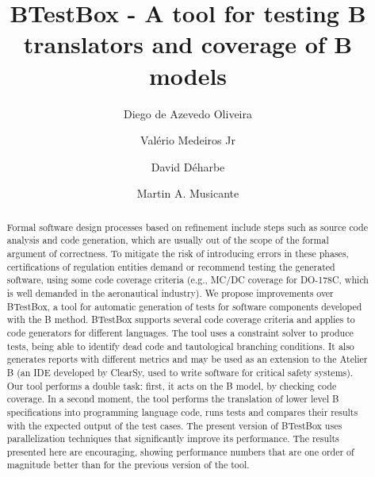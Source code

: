 \documentclass[runningheads]{llncs}
\begin{document}
%
\title{BTestBox - A tool for testing B translators and coverage of B models}
%
%
\author{Diego de Azevedo Oliveira  \and
Val{\'e}rio Medeiros Jr \and
David D{\'e}harbe \and
Martin A. Musicante 
}
%
%
%
\maketitle              %
%
\begin{abstract}
Formal software design processes based on refinement include steps
such as source code analysis and code generation, which are usually
out of the scope of the formal argument of correctness.
To mitigate the risk of introducing errors in these phases,
certifications of regulation entities demand or recommend testing the
generated software, using some code coverage criteria (e.g., MC/DC
coverage for DO-178C, which is well demanded in the aeronautical
industry).
We propose improvements over BTestBox, a tool for automatic generation
of tests for software components developed with the B method.
BTestBox supports several code coverage criteria and applies to code
generators for different languages.
The tool uses a constraint solver to produce tests, being able to
identify dead code and tautological branching conditions.
It also generates reports with different metrics and may be used as an
extension to the Atelier B (an IDE developed by ClearSy, used to write
software for critical safety systems).
Our tool performs a double task: first, it acts on the B model, by
checking code coverage.
In a second moment, the tool performs the translation of lower level B
specifications into programming language code, runs tests and compares
their results with the expected output of the test cases.
The present version of BTestBox uses parallelization techniques that
significantly improve its performance.
The results presented here are encouraging, showing performance
numbers that are one order of magnitude better than for the previous
version of the tool.

\end{abstract}
%
%
%
\end{document}
